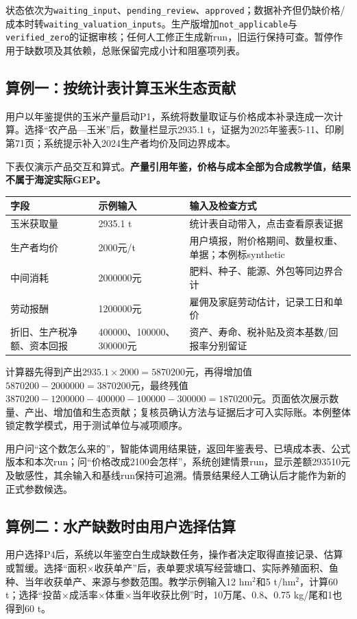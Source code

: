 \documentclass[12pt,a4paper,fontset=fandol]{ctexart}
\newcommand{\file}[1]{\nolinkurl{#1}}
\begin{document}
状态依次为\file{waiting_input}、\file{pending_review}、\file{approved}；数据补齐但仍缺价格/成本时转\file{waiting_valuation_inputs}。生产版增加\file{not_applicable}与\file{verified_zero}的证据审核；任何人工修正生成新run，旧运行保持可查。暂停作用于缺数项及其依赖，总账保留完成小计和阻塞项列表。

\subsection{算例一：按统计表计算玉米生态贡献}
用户以年鉴提供的玉米产量启动P1，系统将数量取证与价格成本补录连成一次计算。选择“农产品—玉米”后，数量栏显示2935.1 t，证据为2025年鉴表5-11、印刷第71页；系统提示补入2024生产者均价及同边界成本。

下表仅演示产品交互和算式。\textbf{产量引用年鉴，价格与成本全部为合成教学值，结果不属于海淀实际GEP。}
\begin{longtable}{P{4.8cm}P{3cm}P{5.2cm}}
\toprule 字段 & 示例输入 & 输入及检查方式 \\\midrule\endhead
玉米获取量 & 2935.1 t & 统计表自动带入，点击查看原表证据 \\
生产者均价 & 2000元/t & 用户填报，附价格期间、数量权重、单据；本例标synthetic \\
中间消耗 & 2000000元 & 肥料、种子、能源、外包等同边界合计 \\
劳动报酬 & 1200000元 & 雇佣及家庭劳动估计，记录工日和单价 \\
折旧、生产税净额、资本回报 & 400000、100000、300000元 & 资产、寿命、税补贴及资本基数/回报率分别留证 \\
\bottomrule
\end{longtable}
计算器先得到产出$2935.1\times2000=5870200$元，再得增加值$5870200-2000000=3870200$元，最终残值$3870200-1200000-400000-100000-300000=1870200$元。页面依次展示数量、产出、增加值和生态贡献；复核员确认方法与证据后才可入实际账。本例整体锁定教学模式，用于测试单位与减项顺序。

用户问“这个数怎么来的”，智能体调用结果链，返回年鉴表号、已填成本表、公式版本和本次run；问“价格改成2100会怎样”，系统创建情景run，显示差额293510元及敏感性，其余输入和基线run保持可追溯。情景结果经人工确认后才能作为新的正式参数候选。

\subsection{算例二：水产缺数时由用户选择估算}
用户选择P4后，系统以年鉴空白生成缺数任务，操作者决定取得直接记录、估算或暂缓。选择“面积×收获单产”后，表单要求填写经营塘口、实际养殖面积、鱼种、当年收获单产、来源与参数范围。教学示例输入12 hm$^2$和5 t/hm$^2$，计算60 t；选择“投苗×成活率×体重×当年收获比例”时，10万尾、0.8、0.75 kg/尾和1也得到60 t。
\end{document}
